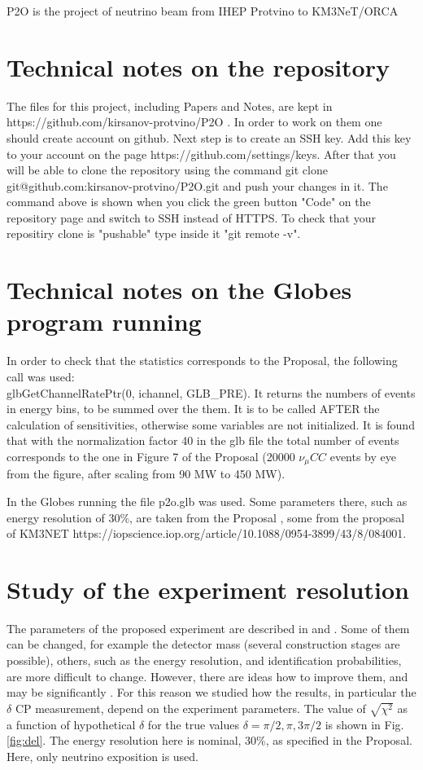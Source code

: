 \documentclass[prd,showpacs,groupedaddress,superscriptaddress,amsmath,amssymb]{revtex4-2} %
\begin{document}
 P2O is the project \cite{Akindinov:2019flp} of neutrino beam from IHEP Protvino to KM3NeT/ORCA \cite{KM3NET}


\section{Technical notes on the repository}


 The files for this project, including Papers and Notes, are kept in https://github.com/kirsanov-protvino/P2O . In order to work
on them one should create account on github. Next step is to create an SSH key. Add this key to your account on the page https://github.com/settings/keys.
After that you will be able to clone the repository using the command git clone git@github.com:kirsanov-protvino/P2O.git and push your changes in it.
The command above is shown when you click the green button "Code" on the repository page and switch to SSH instead of HTTPS.
To check that your repositiry clone is "pushable" type inside it "git remote -v".


\section{Technical notes on the Globes program running}


 In order to check that the statistics corresponds to the Proposal, the following call was used: \\
glbGetChannelRatePtr(0, ichannel, GLB\_PRE).
It returns the numbers of events in energy bins, to be summed over the them. It is to be called AFTER the calculation of sensitivities,
otherwise some variables are not initialized. It is found that with the normalization factor 40 in the glb file the total number of
events corresponds to the one in Figure 7 of the Proposal \cite{Akindinov:2019flp} (20000 $\nu_{\mu}CC$ events by eye from the figure,
after scaling from 90 MW to 450 MW).

 In the Globes running the file p2o.glb was used. Some parameters there, such as energy resolution of 30\%, are taken from the
Proposal \cite{Akindinov:2019flp}, some from the proposal of KM3NET https://iopscience.iop.org/article/10.1088/0954-3899/43/8/084001.


\section{Study of the experiment resolution}


 The parameters of the proposed experiment are described in \cite{Akindinov:2019flp} and \cite{KM3NET}. Some of them can be changed,
for example the detector mass (several construction stages are possible), others, such as the energy resolution, and identification probabilities,
are more difficult to change. However, there are ideas how to improve them, and may be significantly \cite{Perrin_Terrin_2022}.
For this reason we studied how the results, in particular the $\delta$ CP measurement, depend on the experiment parameters.
 The value of $\sqrt{\chi^2}$ as a function of hypothetical $\delta$ for the true values $\delta = \pi/2, \pi, 3\pi/2$ is shown
in Fig. \ref{fig:del}. The energy resolution here is nominal, 30\%, as specified in the Proposal. Here, only neutrino exposition is used.
\end{document}
